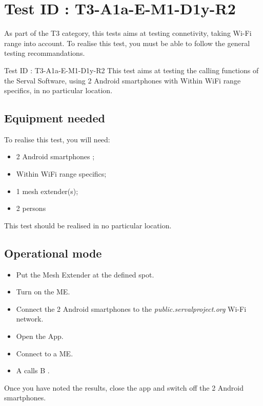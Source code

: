 \documentclass[oneside]{book}
\begin{document}
\section{Test ID : T3-A1a-E-M1-D1y-R2}
\begin{itshape}
As part of the T3 category, this tests aims at testing connetivity, taking Wi-Fi range into account.
To realise this test, you must be able to follow the general testing recommandations.
\end{itshape}
\newline
Test ID : T3-A1a-E-M1-D1y-R2
 This test aims at testing the calling functions of the Serval Software, using 2 Android smartphones with Within WiFi range specifics, in no particular location.
\subsection{Equipment needed} To realise this test, you will need:
\begin{itemize}
\item 2 Android smartphones ;
\item Within WiFi range specifics;
\item 1 mesh extender(s);
\item 2 persons
\end{itemize}
This test should be realised in no particular location.
\subsection{Operational mode} \begin{itemize}
\item Put the Mesh Extender at the defined spot.
\item Turn on the ME.
\item Connect the 2 Android smartphones to the \emph{public.servalproject.org} Wi-Fi network.
\item Open the App.
\item Connect to a ME.
\item A calls B .
\end{itemize}
Once you have noted the results, close the app and switch off the 2 Android smartphones.
\end{document}
